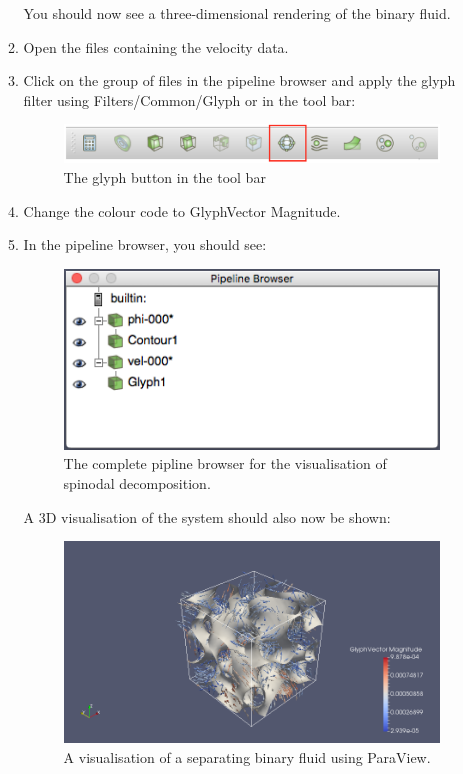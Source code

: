 \documentclass[11pt,twoside,a4paper]{article}
\begin{document}
\begin{enumerate}
\begin{enumerate}
You should now see a three-dimensional rendering of the binary fluid.
\item Open the files containing the velocity data.
\item Click on the group of files in the pipeline browser and apply the glyph filter using 
Filters/Common/Glyph or in the tool bar: 

\begin{figure}[H]
\begin{center}
\includegraphics[width=0.8\linewidth]{glyph.png}
  \caption{The glyph button in the tool bar}
  \label{fig:glyph}
  \end{center}
\end{figure}

\item Change the colour code to GlyphVector Magnitude.
\item In the pipeline browser, you should see:

\begin{figure}[H]
\begin{center}
\includegraphics[width=0.6\linewidth]{pipeline.png}
  \caption{The complete pipline browser for the visualisation of spinodal decomposition.}
  \label{fig:pipeline}
  \end{center}
\end{figure}

A 3D visualisation of the system should also now be shown:

\begin{figure}[H]
\begin{center}
\includegraphics[width=0.8\linewidth]{system.png}
  \caption{A visualisation of a separating binary fluid using ParaView.}
  \label{fig:sysVisualisation}
  \end{center}
\end{figure}


\end{enumerate}
\end{enumerate}
\end{document}

